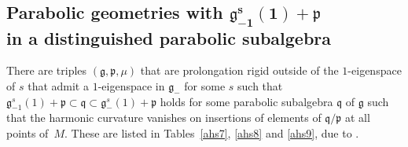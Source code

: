 \documentclass[10pt,a4paper]{amsart}
\newcommand{\fg}{\mathfrak g}
\newcommand{\fv}{\mathfrak q}
\newcommand{\fp}{\mathfrak p}
\numberwithin{equation}{section}
\begin{document}
\subsection[Parabolic geometries with $\fg_{-1}^s(1)+\fp$ in a distinguished parabolic subalgebra]{Parabolic geometries with $\boldsymbol{\fg_{-1}^s(1)+\fp}$ \\ in a distinguished parabolic subalgebra}\label{sec5.4}

There are triples $(\fg,\fp,\mu)$ that are prolongation rigid outside of the $1$-eigenspace of $s$ that admit a $1$-eigenspace in $\fg_-$ for some $s$ such that $\fg_{-1}^s(1)+\fp\subset \fv\subset \fg_{-}^s(1)+\fp$ holds for some parabolic subalgebra $\fv$ of $\fg$ such that the harmonic curvature vanishes on insertions of elements of $\fv/\fp$ at all points of~$M$. These are listed in Tables~\ref{ahs7}, \ref{ahs8} and \ref{ahs9}, due to \cite[Propositions~6.2 and~A.2]{GZ3}.
\end{document}
